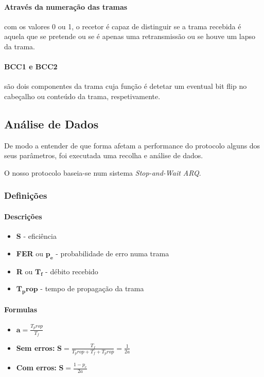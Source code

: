 \paragraph{Através da numeração das tramas} com os valores 0 ou 1, o recetor é capaz de distinguir se a trama recebida é aquela que se pretende ou se é apenas uma retransmissão ou se houve um lapso da trama.

\paragraph{BCC1 e BCC2} são dois componentes da trama cuja função é detetar um eventual bit flip no cabeçalho ou conteúdo da trama, respetivamente.

\subsection{Análise de Dados}

De modo a entender de que forma afetam a performance do protocolo alguns dos seus parâmetros, foi executada uma recolha e análise de dados.

O nosso protocolo baseia-se num sistema \textit{Stop-and-Wait ARQ}. 

\subsubsection{Definições}
\paragraph{Descrições}
\begin{itemize}
    \item \textbf{S} - eficiência
    \item \textbf{FER} ou $\boldsymbol{p_e}$ - probabilidade de erro numa trama
    \item \textbf{R} ou $\boldsymbol{T_f}$ - débito recebido
    \item $\boldsymbol{T_prop}$ - tempo de propagação da trama
\end{itemize}

\paragraph{Formulas}
\begin{itemize}
    \item $\boldsymbol{a} = \frac{T_prop}{T_f}$
    \item \textbf{Sem erros:} $\boldsymbol{S} = \frac{T_f}{T_prop + T_f + T_prop} = \frac{1}{2a}$
    \item \textbf{Com erros:} $\boldsymbol{S} = \frac{1 - p_e}{2a}$
\end{itemize}


